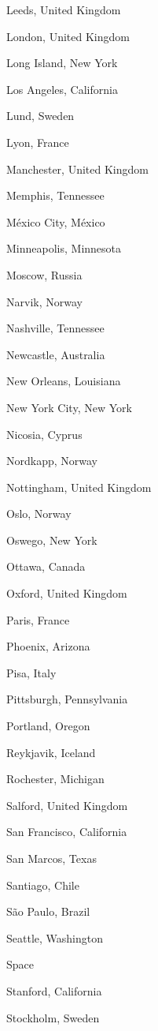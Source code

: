 \documentclass[20pt,landscape]{foils}
\begin{document}
\begin{list1}
\begin{list2}
  \item Leeds, United Kingdom
  \item London, United Kingdom
  \item Long Island, New York
  \item Los Angeles, California
  \item Lund, Sweden
  \item Lyon, France
  \item Manchester, United Kingdom
  \item Memphis, Tennessee
  \item México City, México
  \item Minneapolis, Minnesota
  \item Moscow, Russia
  \item Narvik, Norway
  \item Nashville, Tennessee
  \item Newcastle, Australia
  \item New Orleans, Louisiana
  \item New York City, New York
  \item Nicosia, Cyprus
  \item Nordkapp, Norway
  \item Nottingham, United Kingdom
  \item Oslo, Norway
  \item Oswego, New York
  \item Ottawa, Canada
  \item Oxford, United Kingdom
  \item Paris, France
  \item Phoenix, Arizona
  \item Pisa, Italy
  \item Pittsburgh, Pennsylvania
  \item Portland, Oregon
  \item Reykjavik, Iceland
  \item Rochester, Michigan
  \item Salford, United Kingdom
  \item San Francisco, California
  \item San Marcos, Texas
  \item Santiago, Chile
  \item São Paulo, Brazil
  \item Seattle, Washington
  \item Space
  \item Stanford, California
  \item Stockholm, Sweden

\end{list2}
\end{list1}
\end{document}
